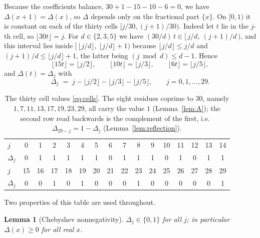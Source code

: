 \documentclass[11pt]{article}
\theoremstyle{plain}
\newtheorem{lemma}[theorem]{Lemma}
\theoremstyle{definition}
\theoremstyle{remark}
\numberwithin{equation}{section}
\begin{document}
Because the coefficients balance, $30 + 1 - 15 - 10 - 6 = 0$, we have $\Delta(x+1) = \Delta(x)$,
so $\Delta$ depends only on the fractional part $\{x\}$. On $[0,1)$ it is constant on each of the
thirty cells $[j/30,(j+1)/30)$. Indeed let $t$ lie in the $j$-th cell, so $\lfloor 30t\rfloor =
j$. For $d \in \{2,3,5\}$ we have $(30/d)\,t \in [\,j/d,\ (j+1)/d\,)$, and this interval lies
inside $[\,\lfloor j/d\rfloor,\ \lfloor j/d\rfloor + 1)$ because $\lfloor j/d\rfloor \le j/d$ and
$(j+1)/d \le \lfloor j/d\rfloor + 1$, the latter being $(j \bmod d) \le d-1$. Hence
\[
  \lfloor 15t \rfloor = \lfloor j/2 \rfloor,\qquad
  \lfloor 10t \rfloor = \lfloor j/3 \rfloor,\qquad
  \lfloor 6t \rfloor = \lfloor j/5 \rfloor ,
\]
and $\Delta(t) = \Delta_j$ with
\begin{equation}
  \Delta_j \;=\; j - \lfloor j/2 \rfloor - \lfloor j/3 \rfloor - \lfloor j/5 \rfloor,
  \qquad j = 0,1,\dots,29 .
  \label{eq:cells}
\end{equation}

\begin{table}[ht]
\centering
\small
\begin{tabular}{@{}l*{15}{c}@{}}
\toprule
$j$        & 0 & 1 & 2 & 3 & 4 & 5 & 6 & 7 & 8 & 9 & 10 & 11 & 12 & 13 & 14 \\
$\Delta_j$ & 0 & 1 & 1 & 1 & 1 & 1 & 0 & 1 & 1 & 1 & 0  & 1  & 0  & 1  & 1  \\
\midrule
$j$        & 15 & 16 & 17 & 18 & 19 & 20 & 21 & 22 & 23 & 24 & 25 & 26 & 27 & 28 & 29 \\
$\Delta_j$ & 0  & 0  & 1  & 0  & 1  & 0  & 0  & 0  & 1  & 0  & 0  & 0  & 0  & 0  & 1  \\
\bottomrule
\end{tabular}
\caption{The thirty cell values \eqref{eq:cells}. The eight residues coprime to $30$, namely
$1,7,11,13,17,19,23,29$, all carry the value $1$ (Lemma~\ref{lem:A}); the second row read
backwards is the complement of the first, i.e.\ $\Delta_{29-j} = 1 - \Delta_j$
(Lemma~\ref{lem:reflection}).}
\label{tab:cells}
\end{table}

Two properties of this table are used throughout.

\begin{lemma}[Chebyshev nonnegativity]
\label{lem:nonneg}
$\Delta_j \in \{0,1\}$ for all $j$; in particular $\Delta(x) \ge 0$ for all real $x$.
\end{lemma}
\end{document}
